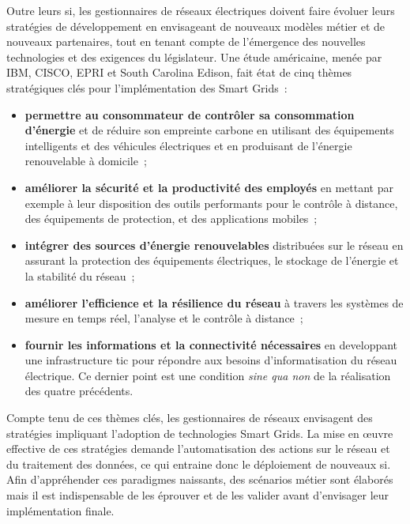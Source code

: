 Outre leurs \gls{si}, les gestionnaires de réseaux électriques doivent faire 
évoluer 
leurs stratégies de développement en envisageant de nouveaux modèles métier et 
de nouveaux partenaires, tout en tenant compte de l'émergence des nouvelles 
technologies et des exigences du législateur. Une étude américaine, menée par 
IBM, CISCO, EPRI et South Carolina Edison, fait état de cinq thèmes stratégiques 
clés pour l'implémentation des Smart Grids~:

\begin{itemize}

    \item \textbf{permettre au consommateur de contrôler sa consommation 
    d'énergie} et de réduire son empreinte carbone en utilisant des équipements 
    intelligents et des véhicules électriques et en produisant de l'énergie 
    renouvelable à domicile~;

    \item \textbf{améliorer la sécurité et la productivité des employés} en 
    mettant par exemple à leur disposition des outils performants pour le 
    contrôle à distance, des équipements de protection, et des applications 
    mobiles~; 

    \item \textbf{intégrer des sources d'énergie renouvelables} distribuées sur 
    le réseau en assurant la protection des équipements électriques, le 
    stockage de l'énergie et la stabilité du réseau~; 

    \item \textbf{améliorer l'efficience et la résilience du réseau} à travers 
    les systèmes de mesure en temps réel, l'analyse et le contrôle à distance~;

    \item \textbf{fournir les informations et la connectivité nécessaires} en
    developpant une infrastructure \gls{tic} pour répondre aux besoins 
    d'informatisation du réseau électrique. Ce dernier point est une condition 
    \textit{sine qua non} de la réalisation des quatre précédents.
\end{itemize}

Compte tenu de ces thèmes clés, les gestionnaires de réseaux envisagent des 
stratégies impliquant l'adoption de technologies Smart Grids. 
La mise en œuvre effective de ces stratégies demande l'automatisation des 
actions sur le réseau et du traitement des données, ce qui entraine donc le 
déploiement de nouveaux \gls{si}. Afin d'appréhender ces paradigmes naissants, 
des 
scénarios métier sont élaborés mais il est indispensable de les éprouver et de 
les valider avant d'envisager leur implémentation finale.

